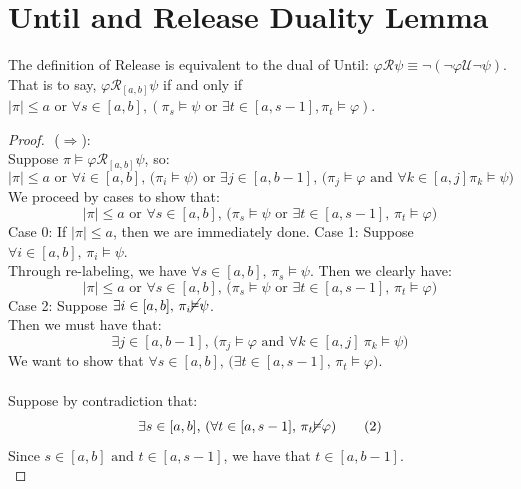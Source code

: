 \documentclass[runningheads]{llncs}
\renewcommand{\phi}{\varphi}
\begin{document}
 \section{Until and Release Duality Lemma} \label{duality appendix}
 \begin{lemma}\label{dual_proof}
 The definition of Release is equivalent to the dual of Until: 
 $\phi \mathcal{R} \psi \equiv \neg (\neg \phi \mathcal{U} \neg \psi)$. That is to say,
$\phi \mathcal{R}_{[a,b]} \psi$ if and only if $|\pi| \le a \text{ or } \forall s \in [a,b] ,(\pi_s \vDash \psi \text{ or } \exists t \in [a, s-1] , \pi_t \vDash \phi)$.
 \end{lemma}
\begin{proof} $ $\newline
($\Rightarrow$):\\
\indent Suppose $\pi \vDash \phi \mathcal{R}_{[a,b]} \psi$, so:
\[ |\pi| \leq a \text{ or } \forall i \in [a,b] \text{, (} \pi_i \vDash \psi \text{) or } \exists j \in [a,b-1] \text{, (} \pi_j \vDash \phi \text{ and } \forall k \in [a, j] \pi_k \vDash \psi \text{)} \]
We proceed by cases to show that:
\[
|\pi| \le a \text{ or } \forall s \in [a,b] \text{, (} \pi_s \vDash \psi \text{ or } \exists t \in [a, s-1] \text{, } \pi_t \vDash \phi \text{)} \tag{A1}
\]
\indent Case 0: If $|\pi| \leq a$, then we are immediately done.
\indent Case 1: Suppose $\forall i \in [a,b] \text{, } \pi_i \vDash \psi$.\\
\indent Through re-labeling, we have $\forall s \in [a,b] \text{, } \pi_s \vDash \psi$. Then we clearly have:
\[
|\pi| \le a \text{ or } \forall s \in [a,b] \text{, (} \pi_s \vDash \psi \text{ or } \exists t \in [a, s-1] \text{, } \pi_t \vDash \phi \text{)} \tag{A1}
\]
\indent Case 2: Suppose $\exists i \in [a,b] \text{, } \pi_i \cancel{\vDash} \psi$.\\
\indent \indent Then we must have that:
\[ \exists j \in [a,b-1] \text{, (} \pi_j \vDash \phi \text{ and } \forall k \in [a, j] \ \pi_k \vDash \psi \text{)} \tag{1} \]
\indent \indent We want to show that $ \forall s \in [a,b] \text{, (} \exists t \in [a, s-1] \text{, } \pi_t \vDash \phi \text{)}$.\\
\\
\indent \indent Suppose by contradiction that: 
\[ \exists s \in [a,b] \text{, (} \forall t \in [a, s-1] \text{, } \pi_t \cancel{\vDash} \phi \text{)} \tag{2} \]
\indent \indent Since $s \in [a,b] \text{ and }  t \in [a, s-1]$, we have that $t \in [a,b-1]$.\\

\end{proof}
\end{document}
